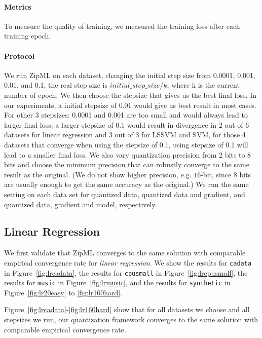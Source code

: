 \documentclass{article}
\begin{document}
\paragraph{Metrics} To measure the quality of training,
we measured the training loss after each training epoch.

\paragraph{Protocol} We run ZipML on each dataset, changing the initial step size from 0.0001, 0.001, 0.01, and 0.1, the real step size is ${initial\_step\_size/k}$, where k is the current number of epoch. We then choose the stepsize that gives us the best final loss. In our experiments, a initial stepsize of 0.01 would give us best result in most cases. For other 3 stepsizes: 0.0001 and 0.001 are too small and would always lead to larger final loss; a larger stepsize of 0.1 would result in divergence in 2 out of 6 datasets for linear regression and 3 out of 3 for LSSVM and SVM, for those 4 datasets that converge when using the stepsize of 0.1, using stepsize of 0.1 will lead to a smaller final loss. We also vary quantization precision from 2 bits to 8 bits and choose the minimum precision that can robustly converge to the same result as the  original. (We do not show higher precision, e.g. $16$-bit, since $8$ bits are usually enough to get the same accuracy as the original.) 
We run the same setting on each data set for quantized data, quantized data and gradient, and quantized data, gradient and model, respectively.


\subsection{Linear Regression}
We first validate that ZipML 
converges to the same solution with comparable
empirical convergence rate for \emph{linear regression}.
We show the results for \texttt{cadata} in Figure~\ref{fig:lrcadata}, the results for \texttt{cpusmall} in Figure~\ref{fig:lrcpusmall}, the results for \texttt{music} in Figure~\ref{fig:lrmusic}, and the results for \texttt{synthetic} in Figure~\ref{fig:lr20easy} to \ref{fig:lr160hard}.

Figure~\ref{fig:lrcadata}-\ref{fig:lr160hard} show that for all datasets we choose and all stepsizes we run, our quantization framework
converges to the same solution with comparable
empirical convergence rate. 
\end{document}
